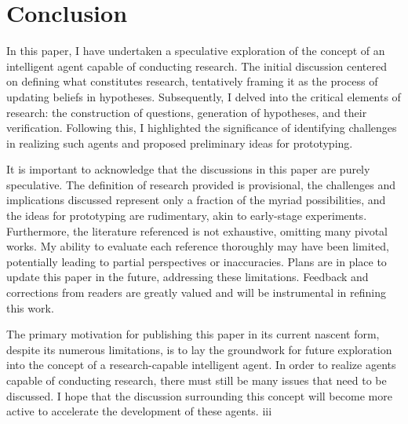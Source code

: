 \section{Conclusion}
In this paper, I have undertaken a speculative exploration of the concept of an intelligent agent capable of conducting research. The initial discussion centered on defining what constitutes research, tentatively framing it as the process of updating beliefs in hypotheses. Subsequently, I delved into the critical elements of research: the construction of questions, generation of hypotheses, and their verification. Following this, I highlighted the significance of identifying challenges in realizing such agents and proposed preliminary ideas for prototyping.

It is important to acknowledge that the discussions in this paper are purely speculative. The definition of research provided is provisional, the challenges and implications discussed represent only a fraction of the myriad possibilities, and the ideas for prototyping are rudimentary, akin to early-stage experiments. Furthermore, the literature referenced is not exhaustive, omitting many pivotal works. My ability to evaluate each reference thoroughly may have been limited, potentially leading to partial perspectives or inaccuracies. Plans are in place to update this paper in the future, addressing these limitations. Feedback and corrections from readers are greatly valued and will be instrumental in refining this work.

The primary motivation for publishing this paper in its current nascent form, despite its  numerous limitations, is to lay the groundwork for future exploration into the concept of a research-capable intelligent agent. In order to realize agents capable of conducting research, there must still be many issues that need to be discussed. I hope that the discussion surrounding this concept will become more active to accelerate the development of these agents.
iii


